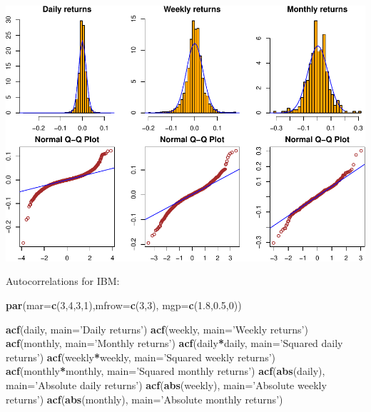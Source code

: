 \documentclass[11pt,]{article}
\newenvironment{Shaded}{\begin{snugshade}}{\end{snugshade}}
\newcommand{\DataTypeTok}[1]{\textcolor[rgb]{0.13,0.29,0.53}{#1}}
\newcommand{\DecValTok}[1]{\textcolor[rgb]{0.00,0.00,0.81}{#1}}
\newcommand{\FloatTok}[1]{\textcolor[rgb]{0.00,0.00,0.81}{#1}}
\newcommand{\KeywordTok}[1]{\textcolor[rgb]{0.13,0.29,0.53}{\textbf{#1}}}
\newcommand{\NormalTok}[1]{#1}
\newcommand{\OperatorTok}[1]{\textcolor[rgb]{0.81,0.36,0.00}{\textbf{#1}}}
\newcommand{\StringTok}[1]{\textcolor[rgb]{0.31,0.60,0.02}{#1}}
\begin{document}
\includegraphics{hw1_files/figure-latex/unnamed-chunk-7-1.pdf}

Autocorrelations for IBM:

\begin{Shaded}
\begin{Highlighting}[]
\KeywordTok{par}\NormalTok{(}\DataTypeTok{mar=}\KeywordTok{c}\NormalTok{(}\DecValTok{3}\NormalTok{,}\DecValTok{4}\NormalTok{,}\DecValTok{3}\NormalTok{,}\DecValTok{1}\NormalTok{),}\DataTypeTok{mfrow=}\KeywordTok{c}\NormalTok{(}\DecValTok{3}\NormalTok{,}\DecValTok{3}\NormalTok{), }\DataTypeTok{mgp=}\KeywordTok{c}\NormalTok{(}\FloatTok{1.8}\NormalTok{,}\FloatTok{0.5}\NormalTok{,}\DecValTok{0}\NormalTok{)) }

\KeywordTok{acf}\NormalTok{(daily,  }\DataTypeTok{main=}\StringTok{'Daily returns'}\NormalTok{)}
\KeywordTok{acf}\NormalTok{(weekly, }\DataTypeTok{main=}\StringTok{'Weekly returns'}\NormalTok{)}
\KeywordTok{acf}\NormalTok{(monthly, }\DataTypeTok{main=}\StringTok{'Monthly returns'}\NormalTok{)}
\KeywordTok{acf}\NormalTok{(daily}\OperatorTok{*}\NormalTok{daily, }\DataTypeTok{main=}\StringTok{'Squared daily returns'}\NormalTok{)}
\KeywordTok{acf}\NormalTok{(weekly}\OperatorTok{*}\NormalTok{weekly, }\DataTypeTok{main=}\StringTok{'Squared weekly returns'}\NormalTok{)}
\KeywordTok{acf}\NormalTok{(monthly}\OperatorTok{*}\NormalTok{monthly, }\DataTypeTok{main=}\StringTok{'Squared monthly returns'}\NormalTok{)}
\KeywordTok{acf}\NormalTok{(}\KeywordTok{abs}\NormalTok{(daily), }\DataTypeTok{main=}\StringTok{'Absolute daily returns'}\NormalTok{)}
\KeywordTok{acf}\NormalTok{(}\KeywordTok{abs}\NormalTok{(weekly),  }\DataTypeTok{main=}\StringTok{'Absolute weekly returns'}\NormalTok{)}
\KeywordTok{acf}\NormalTok{(}\KeywordTok{abs}\NormalTok{(monthly), }\DataTypeTok{main=}\StringTok{'Absolute monthly returns'}\NormalTok{)}
\end{Highlighting}
\end{Shaded}
\end{document}
